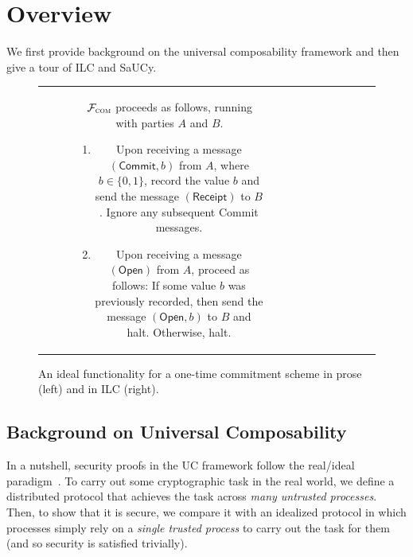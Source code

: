 \section{Overview}
\label{sec:overview}

We first provide background on the universal composability framework and then
give a tour of ILC and SaUCy.

\begin{figure}[t]
\centering
\begin{tabular}{c|c}
\begin{subfigure}{.575\textwidth}
    $\mathcal{{F}}_{\textsc{com}}$ proceeds as follows, running with parties $A$ and
  $B$.
    \begin{enumerate}
        \item Upon receiving a message $(\mathsf{Commit}, b)$ from $A$, where $b
          \in \{ 0, 1 \}$, record the value $b$ and send the message
          $(\mathsf{Receipt})$ to $B$. Ignore any subsequent \textsf{Commit}
          messages.
        \item Upon receiving a message $(\mathsf{Open})$ from $A$, proceed as
          follows: If some value $b$ was previously recorded, then send the
          message $(\mathsf{Open}, b)$ to $B$ and halt. Otherwise, halt.
    \end{enumerate}
\label{func:com}
\end{subfigure}\hspace{0.02\textwidth}
&\hspace{0.02\textwidth}
\begin{subfigure}{.35\textwidth}
  
\end{subfigure}
\end{tabular}
\caption{An ideal functionality for a one-time commitment scheme in prose (left)
  and in ILC (right).}
\label{func:com}
\end{figure}

\subsection{Background on Universal Composability}
\label{subsec:background-uc}

In a nutshell, security proofs in the UC framework follow the real/ideal
paradigm~\cite{goldreich1987play}. To carry out some cryptographic task in the
real world, we define a distributed protocol that achieves the task across
\emph{many untrusted processes}. Then, to show that it is secure, we compare it
with an idealized protocol in which processes simply rely on a \emph{single
  trusted process} to carry out the task for them (and so security is satisfied
trivially).

